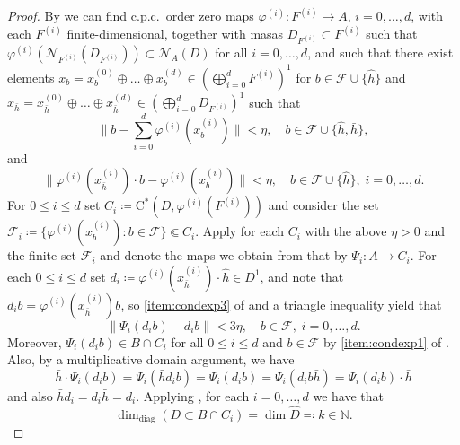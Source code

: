 \documentclass[11pt,a4paper]{amsart}
\theoremstyle{definition}
\numberwithin{equation}{section}
\newcommand{\mc}[1]{\mathcal{#1}}
\newcommand{\bb}[1]{\mathbb{#1}}
\begin{document}
\begin{proof}
By \cite[Proposition~2.3]{LiLiaWin23} we can find c.p.c.\ order zero maps $\varphi^{(i)}\colon F^{(i)}\to A$, $i=0,\dots,d$, with each $F^{(i)}$ finite-dimensional, together with masas $D_{F^{(i)}}\subset F^{(i)}$ such that $\varphi^{(i)}(\mc{N}_{F^{(i)}}(D_{F^{(i)}}))\subset\mc{N}_A(D)$ for all $i=0,\dots,d$, and such that there exist elements $x_b=x_b^{(0)}\oplus\dots\oplus x_b^{(d)}\in (\bigoplus_{i=0}^dF^{(i)})^1$ for $b\in\mc{F}\cup\{\hat{h}\}$ and $x_{\bar{h}}=x_{\bar{h}}^{(0)}\oplus\dots\oplus x_{\bar{h}}^{(d)} \in (\bigoplus_{i=0}^dD_{F^{(i)}})^1$ such that
\begin{equation}\label{eq:mainproof1}
\bigg\|b-\sum_{i=0}^d\varphi^{(i)}(x_b^{(i)})\bigg\|<\eta, \quad b\in \mc{F}\cup\{\hat{h},\bar{h}\},
\end{equation}
and
\begin{equation}\label{eq:mainproof2}
\|\varphi^{(i)}(x_{\bar{h}}^{(i)})\cdot b-\varphi^{(i)}(x_b^{(i)})\|<\eta,\quad b\in\mc{F}\cup\{\hat{h}\},\; i=0,\dots,d.
\end{equation}
For $0\le i\le d$ set $C_i\coloneqq \mathrm{C}^\ast(D,\varphi^{(i)}(F^{(i)}))$ and consider the set $\mathcal{F}_i\coloneqq \{\varphi^{(i)}(x_b^{(i)}): b\in\mc{F}\}\Subset C_i$. Apply  for each $C_i$ with the above $\eta>0$ and the finite set $\mc{F}_i$ and denote the maps we obtain from that by $\Psi_i\colon A\to C_i$. For each $0\le i\le d$ set  $d_i\coloneqq \varphi^{(i)}(x_{\bar{h}}^{(i)})\cdot \hat{h}\in D^1$,  and note that $d_ib = \varphi^{(i)}(x_{\bar{h}}^{(i)}) b$, so \ref{item:condexp3} of  and a triangle inequality yield that
\begin{equation}\label{eq:mainproof3}
\|\Psi_i(d_ib)-d_ib\|<3\eta,\quad b\in\mc{F},\; i=0,\dots, d.
\end{equation}
Moreover, $\Psi_i(d_ib)\in B\cap C_i$ for all $0\le i\le d$ and $b\in\mc{F}$ by \ref{item:condexp1} of . Also, by a multiplicative domain argument, we have
\begin{equation}
\bar{h}\cdot \Psi_i(d_ib) = \Psi_i(\bar{h}d_ib) = \Psi_i(d_ib) = \Psi_i(d_ib\bar{h})=\Psi_i(d_ib)\cdot\bar{h}
\end{equation}
and also $\bar{h}d_i=d_i\bar{h}=d_i$. Applying , for each $i=0,\dots,d$ we have that 
\begin{equation*}
\dim_\mathrm{diag}(D\subset B\cap C_i) = \dim\widehat{D}\eqqcolon k\in\bb{N}.
\end{equation*} 

\end{proof}
\end{document}

